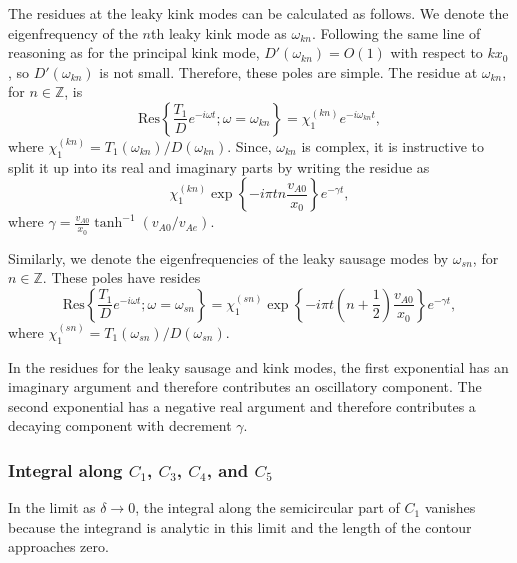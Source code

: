 The residues at the leaky kink modes can be calculated as follows. We denote the eigenfrequency of the $n$th leaky kink mode as $\omega_{kn}$. Following the same line of reasoning as for the principal kink mode, $D'(\omega_{kn}) = O(1)$ with respect to $kx_0$, so $D'(\omega_{kn})$ is not small. Therefore, these poles are simple. The residue at $\omega_{kn}$, for $n \in \mathbb{Z}$, is
\begin{equation}
\text{Res}\left\{ \frac{T_1}{D} e^{-i\omega t} ; \omega = \omega_{kn} \right\} = \chi_1^{(kn)} e^{-i\omega_{kn} t},
\end{equation}
where $\chi_1^{(kn)} = T_1(\omega_{kn})/D(\omega_{kn})$. Since, $\omega_{kn}$ is complex, it is instructive to split it up into its real and imaginary parts by writing the residue as
\begin{equation}
\chi_1^{(kn)} \exp\left\{-i \pi tn\frac{v_{A0}}{x_0}\right\} e^{-\gamma t},
\end{equation}
where $\gamma = \frac{v_{A0}}{x_0}\tanh^{-1}(v_{A0}/v_{Ae})$.

Similarly, we denote the eigenfrequencies of the leaky sausage modes by $\omega_{sn}$, for $n \in \mathbb{Z}$. These poles have resides
\begin{equation}
\text{Res}\left\{ \frac{T_1}{D} e^{-i\omega t} ; \omega = \omega_{sn} \right\} = \chi_1^{(sn)} \exp\left\{-i \pi t\left(n + \frac{1}{2}\right)\frac{v_{A0}}{x_0}\right\} e^{-\gamma t},
\end{equation}
where $\chi_1^{(sn)} = T_1(\omega_{sn})/D(\omega_{sn})$.

In the residues for the leaky sausage and kink modes, the first exponential has an imaginary argument and therefore contributes an oscillatory component. The second exponential has a negative real argument and therefore contributes a decaying component with decrement $\gamma$.


\subsubsection{Integral along $C_1$, $C_3$, $C_4$, and $C_5$}
In the limit as $\delta \to 0$, the integral along the semicircular part of $C_1$ vanishes because the integrand is analytic in this limit and the length of the contour approaches zero.

